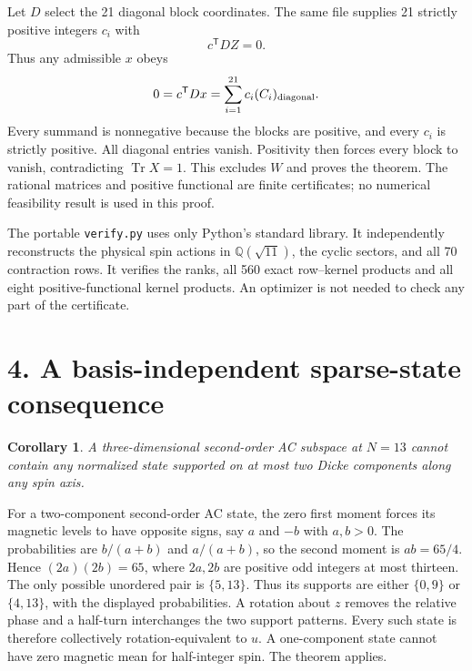 \documentclass[11pt]{article}
\newtheorem{corollary}{Corollary}
\newcommand{\Tr}{\operatorname{Tr}}
\begin{document}
Let $D$ select the 21 diagonal block coordinates. The same file supplies
21 strictly positive integers $c_i$ with
\[
 c^{\mathsf T}DZ=0.
\]
Thus any admissible $x$ obeys
\[
 0=c^{\mathsf T}Dx=\sum_{i=1}^{21}c_i(C_i)_{\rm diagonal}.
\]
Every summand is nonnegative because the blocks are positive, and every
$c_i$ is strictly positive. All diagonal entries vanish. Positivity then
forces every block to vanish, contradicting $\Tr X=1$. This excludes $W$
and proves the theorem. The rational matrices and positive functional are
finite certificates; no numerical feasibility result is used in this proof.

The portable \texttt{verify.py} uses only Python's standard library. It
independently reconstructs the physical spin actions in
$\mathbb Q(\sqrt{11})$, the cyclic sectors, and all 70 contraction rows.
It verifies the ranks, all 560 exact row--kernel products and all eight
positive-functional kernel products. An optimizer is not needed to check
any part of the certificate.

\section*{4. A basis-independent sparse-state consequence}
\begin{corollary}
A three-dimensional second-order AC subspace at $N=13$ cannot contain
any normalized state supported on at most two Dicke components along
any spin axis.
\end{corollary}
For a two-component second-order AC state, the zero first moment forces
its magnetic levels to have opposite signs, say $a$ and $-b$ with $a,b>0$.
The probabilities are $b/(a+b)$ and $a/(a+b)$, so the second moment is
$ab=65/4$. Hence $(2a)(2b)=65$, where $2a,2b$ are positive odd integers
at most thirteen. The only possible unordered pair is $\{5,13\}$.
Thus its supports are either $\{0,9\}$ or $\{4,13\}$, with the displayed
probabilities. A rotation about $z$ removes the relative phase and a
half-turn interchanges the two support patterns. Every such state is
therefore collectively rotation-equivalent to $u$. A one-component state
cannot have zero magnetic mean for half-integer spin. The theorem applies.
\end{document}
